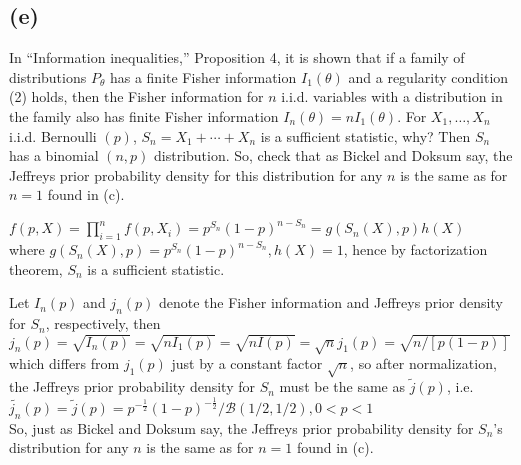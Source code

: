 \documentclass[11pt]{article}
\newcommand{\Beta}{\mathcal{B}}
\newcommand{\ProbS}{\iftrue}
\newcommand{\ProbE}{\fi}
\begin{document}
\subsection*{(e)}
\ProbS
In ``Information inequalities,'' Proposition 4, it is shown that if a family of distributions $P_{\theta}$ has a finite Fisher information $I_1(\theta)$ and a regularity condition (2) holds, then the Fisher information for $n$ i.i.d. variables with a distribution in the family also has finite Fisher information $I_{n}(\theta) = nI_1(\theta)$.
For $X_1, \dots, X_n$ i.i.d. Bernoulli $(p)$, $S_n = X_1 + \cdots + X_n$ is a sufficient statistic, why?
Then $S_n$ has a binomial $(n, p)$ distribution. So, check that as Bickel and Doksum say, the Jeffreys prior probability density for this distribution for any $n$ is the same as for $n=1$ found in (c).
\ProbE

$
f(p, X) = \prod_{i=1}^{n} f(p, X_i) =
p^{S_n}(1-p)^{n-S_n}
= g(S_n(X), p)h(X)
$
\\
where
$
g(S_n(X), p) =
p^{S_n}(1-p)^{n-S_n}
,
h(X)=1
$,
hence by factorization theorem, $S_n$ is a sufficient statistic.

Let $I_n(p)$ and $j_n(p)$ denote the Fisher information and Jeffreys prior density for $S_n$, respectively, then
\\
$
j_n(p) = \sqrt{I_n(p)}
= \sqrt{nI_1(p)}
= \sqrt{nI(p)}
= \sqrt{n}j_1(p)
= \sqrt{n / [p(1-p)]}
$
\\
which differs from $j_1(p)$ just by a constant factor $\sqrt{n}$,
so after normalization, the Jeffreys prior probability density for $S_n$ must be the same as $\tilde{j}(p)$, i.e.
\\
$
\tilde{j_n}(p) = \tilde{j}(p) = 
p^{-\frac{1}{2}}(1-p)^{-\frac{1}{2}}/\Beta(1/2, 1/2), 0<p<1
$
\\
So, just as Bickel and Doksum say, the Jeffreys prior probability density for $S_n$'s distribution for any $n$ is the same as for $n = 1$ found in (c).
\end{document}
